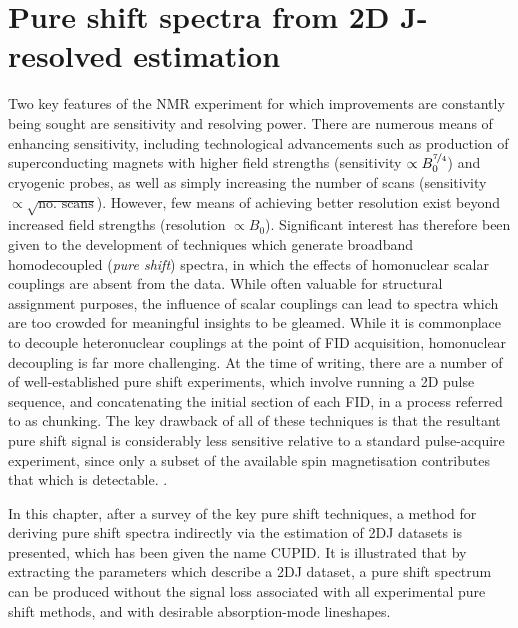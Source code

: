 \chapter{Pure shift spectra from 2D J-resolved estimation}

Two key features of the \ac{NMR} experiment for which improvements are
constantly being sought are sensitivity and resolving power. There are numerous
means of enhancing sensitivity, including technological advancements such as
production of superconducting magnets with higher field
strengths\cite{Maeda2019} (sensitivity $\propto B_0^{\nicefrac{7}{4}}$) and
cryogenic probes\cite{Styles1984,Styles1989,Kovacs2005}, as well as simply
increasing the number of scans (sensitivity $\propto \sqrt{\text{no. scans}}$).
However, few means of achieving better resolution exist beyond increased field
strengths (resolution $\propto B_0$).  Significant interest has therefore been given to the
development of techniques which generate broadband homodecoupled (\emph{pure
shift}) spectra, in which the effects of homonuclear scalar couplings are
absent from the data. While often valuable for structural assignment purposes,
the influence of scalar couplings can lead to spectra which are too crowded for
meaningful insights to be gleamed. While it is commonplace to decouple
heteronuclear couplings at the point of \ac{FID} acquisition\cite{Shaka1983a,
Shaka1983b,Shaka1985}, homonuclear decoupling is far more challenging. At
the time of writing, there are a number of of well-established pure shift
experiments, which involve running a \ac{2D} pulse sequence, and concatenating
the initial section of each \ac{FID}, in a process referred to as
chunking\cite{Meyer2013,Adams2014,Zangger2015}. The key drawback of all of
these techniques is that the resultant pure shift signal is considerably less sensitive relative to a standard pulse-acquire experiment, since only a subset
 of the available spin magnetisation
contributes that which is detectable.
.

In this chapter, after a survey of the key pure shift techniques, a method for
deriving pure shift spectra indirectly via the estimation of \ac{2DJ} datasets
is presented, which has been given the name \acf{CUPID}. It is illustrated that
by extracting the parameters which describe a \ac{2DJ} dataset, a pure shift
spectrum can be produced without the signal loss associated with all
experimental pure shift methods, and with desirable absorption-mode lineshapes.





